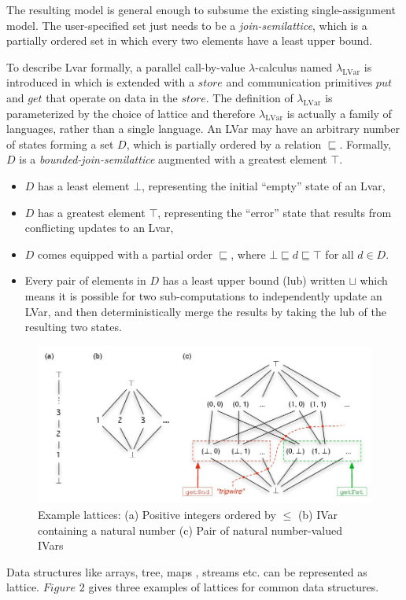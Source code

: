 \documentclass[twocolumn]{article}
\newcommand{\lambdaLVar}{\ensuremath{\lambda_{\textrm{LVar}}}}
\newcommand{\userleq}{\ensuremath{\sqsubseteq}}
\begin{document}
The resulting model is general enough to subsume the existing single-assignment model. The user-specified set just needs to be a \textit{join-semilattice}, which is a partially ordered set in which every two elements have a least upper bound. 

To describe Lvar formally, a parallel call-by-value $\lambda$-calculus named $\lambdaLVar$ is introduced in \cite{lkuper} which is extended with a $store$ and communication primitives $put$ and $get$ that operate on data in the $store$. The definition of $\lambdaLVar$ is parameterized by the choice of lattice and therefore $\lambdaLVar$ is actually a family of languages, rather than a single language. An LVar may have an arbitrary number of states forming a set $D$, which is partially ordered by a relation $\userleq$. Formally, $D$ is a \emph{bounded-join-semilattice} augmented with a greatest element $\top$. 
\begin{itemize}
\item $D$ has a least element $\bot$, representing the initial “empty” state of an Lvar,
\item $D$ has a greatest element $\top$, representing the “error” state that results from conflicting updates to an Lvar,
\item $D$ comes equipped with a partial order $\userleq$, where $\bot \userleq d \userleq \top$ for all $d \in D$.
\item Every pair of elements in $D$ has a least upper bound (lub) written $\sqcup$ which means it is possible for two sub-computations to independently update an LVar, and then deterministically merge the results by taking the lub of the resulting two states.
\end{itemize}
\begin{figure}
\centerline{
\includegraphics[width=1.0\columnwidth]{Figures/lattice.jpg}
}
\caption{Example lattices\cite{lkuper}: (a) Positive integers ordered by $\leq$ (b) IVar containing a natural number (c) Pair of natural number-valued IVars}
\label{Figure1}
\end{figure}
Data structures like arrays, tree, maps , streams etc. can be represented  as lattice. $Figure$ $2$ gives three examples of lattices for common data structures.
 
\end{document}
